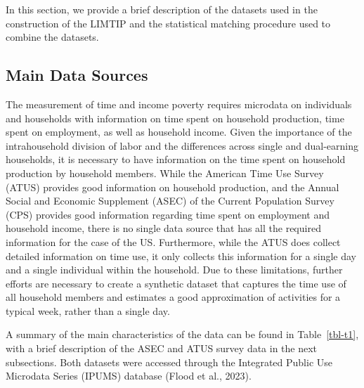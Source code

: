 \documentclass[
  11pt,
]{article}
\begin{document}
In this section, we provide a brief description of the datasets used in
the construction of the LIMTIP and the statistical matching procedure
used to combine the datasets.

\subsection{Main Data Sources}\label{main-data-sources}

The measurement of time and income poverty requires microdata on
individuals and households with information on time spent on household
production, time spent on employment, as well as household income. Given
the importance of the intrahousehold division of labor and the
differences across single and dual-earning households, it is necessary
to have information on the time spent on household production by
household members. While the American Time Use Survey (ATUS) provides
good information on household production, and the Annual Social and
Economic Supplement (ASEC) of the Current Population Survey (CPS)
provides good information regarding time spent on employment and
household income, there is no single data source that has all the
required information for the case of the US. Furthermore, while the ATUS
does collect detailed information on time use, it only collects this
information for a single day and a single individual within the
household. Due to these limitations, further efforts are necessary to
create a synthetic dataset that captures the time use of all household
members and estimates a good approximation of activities for a typical
week, rather than a single day.

A summary of the main characteristics of the data can be found in
Table~\ref{tbl-t1}, with a brief description of the ASEC and ATUS survey
data in the next subsections. Both datasets were accessed through the
Integrated Public Use Microdata Series (IPUMS) database (Flood et al.,
2023).
\end{document}
